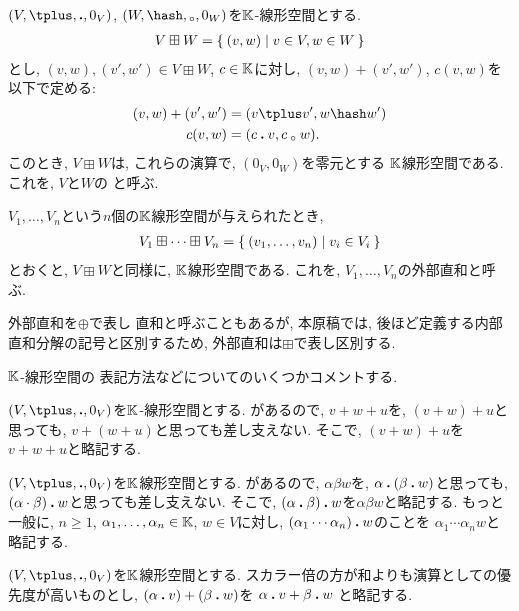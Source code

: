 \begin{example}
  $(V,\plus,\act,0_V)$, $(W,\pplus,\aact,0_W)$を$\mathbb{K}$-線形空間とする.
\begin{align*}
V\boxplus W = \Set{(v,w)|v\in V, w\in W}
\end{align*}
とし, $(v,w),(v',w')\in V\boxplus W$, $c\in\mathbb{K}$に対し,
$(v,w)+(v',w')$, $c(v,w)$を以下で定める:
\begin{align*}
(v,w)+(v',w')&=(v\plus v', w\pplus w')\\
c(v,w)&=(c\act v,c\aact w).
\end{align*}
このとき,
$V\boxplus W$は, これらの演算で, $(0_V,0_W)$を零元とする
$\mathbb{K}$線形空間である.
これを,
$V$と$W$の
%
%
と呼ぶ.

$V_1,\ldots, V_n$という$n$個の$\mathbb{K}$線形空間が与えられたとき,
\begin{align*}
V_1\boxplus \cdots \boxplus V_n = \Set{(v_1,\ldots,v_n)|v_i\in V_i}
\end{align*}
とおくと,
$V\boxplus W$と同様に,
$\mathbb{K}$線形空間である.
これを, 
$V_1,\ldots, V_n$の外部直和と呼ぶ.
\end{example}
\begin{remark}
外部直和を$\oplus$で表し
直和と呼ぶこともあるが,
本原稿では,
後ほど定義する内部直和分解の記号と区別するため,
外部直和は$\boxplus$で表し区別する.
\end{remark}

$\mathbb{K}$-線形空間の
表記方法などについてのいくつかコメントする.
\begin{remark}
$(V,\plus,\act,0_V)$を$\mathbb{K}$-線形空間とする.
があるので, $v\plus w\plus u$を, $(v\plus w)\plus u$と思っても,
$v\plus (w\plus u)$と思っても差し支えない.
そこで, $(v\plus w)\plus u$を$v\plus w\plus u$と略記する.
\end{remark}
\begin{remark}
$(V,\plus,\act,0_V)$を$\mathbb{K}$線形空間とする.
があるので, $\alpha \beta w$を, $\alpha\mathbin{\boldsymbol{.}} (\beta\mathbin{\boldsymbol{.}} w)$と思っても,
$(\alpha\cdot\beta)\mathbin{\boldsymbol{.}} w$と思っても差し支えない.
そこで, $(\alpha\mathbin{\boldsymbol{.}} \beta)\mathbin{\boldsymbol{.}} w$を$\alpha \beta w$と略記する.
もっと一般に, $n\geq 1$, $\alpha_1,\ldots,\alpha_n\in\mathbb{K}$, $w\in V$に対し,
$(\alpha_1\cdots \alpha_n)\mathbin{\boldsymbol{.}} w$のことを
$\alpha_1\cdots \alpha_n w$と略記する.
\end{remark}
\begin{remark}
$(V,\plus,\act,0_V)$を$\mathbb{K}$線形空間とする.
スカラー倍の方が和よりも演算としての優先度が高いものとし,
$(\alpha\mathbin{\boldsymbol{.}} v)+(\beta\mathbin{\boldsymbol{.}} w)$を
$\alpha\mathbin{\boldsymbol{.}} v+\beta\mathbin{\boldsymbol{.}} w$
と略記する.
\end{remark}

